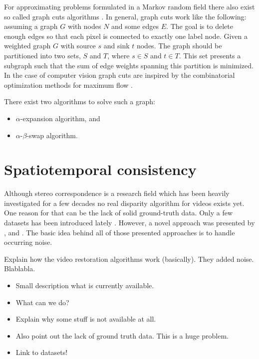 For approximating problems formulated in a Markov random field there also exist so called graph cuts algorithms \citep{boykov2001fast, cyganek2011introduction}.
In general, graph cuts work like the following: assuming a graph $G$ with nodes $N$ and some edges $E$.
The goal is to delete enough edges so that each pixel is connected to exactly one label node.
Given a weighted graph $G$ with source $s$ and sink $t$ nodes.
The graph should be partitioned into two sets, $S$ and $T$, where $s \in S$ and $t \in T$.
This set presents a subgraph such that the sum of edge weights spanning this partition is minimized.
\newline\newline\noindent In the case of computer vision graph cuts are inspired by the combinatorial optimization methods for maximum flow \citep{cyganek2011introduction, cormen2009introduction}.


There exist two algorithms to solve such a graph:
\begin{itemize}
  \item $\alpha$-expansion algorithm, and
  \item $\alpha$-$\beta$-swap algorithm.
\end{itemize}

\section{Spatiotemporal consistency}

Although stereo correspondence is a research field which has been heavily investigated for a few decades no real disparity algorithm for videos exists yet.
One reason for that can be the lack of solid ground-truth data.
Only a few datasets has been introduced lately \citep{Butler:ECCV:2012, scharstein2014high}.
However, a novel approach was presented by \citep{richardt2010real}, \citep{khoshabeh2011spatio} and \citep{hosni2012temporally}.
The basic idea behind all of those presented approaches is to handle occurring noise.

Explain how the video restoration algorithms work (basically). They added noise. Blablabla.

\begin{itemize}
  \item Small description what is currently available.
  \item What can we do?
  \item Explain why some stuff is not available at all.
  \item Also point out the lack of ground truth data. This is a huge problem.
  \item Link to datasets!
\end{itemize}

